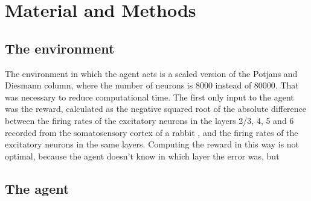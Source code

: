 \section{Material and Methods}

\subsection{The environment}

The environment in which the agent acts is a scaled version of the Potjans and Diesmann column, where the number of neurons is 8000 instead of 80000. That was necessary to reduce computational time. The first only input to the agent was the reward, calculated as the negative squared root of the absolute difference between the firing rates of the excitatory neurons in the layers 2/3, 4, 5 and 6 recorded from the somatosensory cortex of a rabbit \cite{kock}, and the firing rates of the excitatory neurons in the same layers. Computing the reward in this way is not optimal, because the agent doesn't know in which layer the error was, but 


\subsection{The agent}




